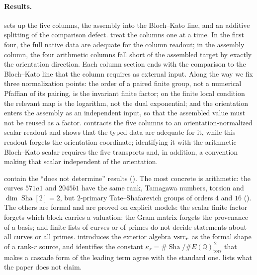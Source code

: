 \documentclass[11pt]{article}
\theoremstyle{definition}
\newcommand{\Q}{\mathbb{Q}}
\newcommand{\Sha}{\operatorname{Sha}}
\newcommand{\tors}{\operatorname{tors}}
\newcommand{\kapr}{\kappa_r}
\begin{document}
\paragraph{Results.}
 sets up the five columns, the assembly into the
Bloch--Kato line, and an additive splitting of the comparison defect.
treat the columns one at a time.  In the first four, the full native data
are adequate for the column readout; in the assembly column, the four
arithmetic columns fall short of the assembled target by exactly the
orientation direction.  Each column section ends with the comparison to
the Bloch--Kato line that the column requires as external input.  Along the way
we fix three normalization points: the order of a paired finite group,
not a numerical Pfaffian of its pairing, is the invariant finite factor;
on the finite local condition the relevant map is the logarithm, not the
dual exponential; and the orientation enters the assembly as an
independent input, so that the assembled value must not be reused as a
factor.   contracts the five columns to an
orientation-normalized scalar readout and shows that the typed data are
adequate for it, while this readout forgets the orientation coordinate;
identifying it with the arithmetic Bloch--Kato scalar requires the five
transports and, in addition, a convention making that scalar independent
of the orientation.

contain the ``does not determine'' results ().  The
most concrete is arithmetic: the curves $571a1$ and $2045b1$ have the same
rank, Tamagawa numbers, torsion and $\dim\Sha[2]=2$, but $2$-primary
Tate--Shafarevich groups of orders $4$ and $16$
().  The others are formal and are proved on
explicit models: the scalar finite factor forgets which block carries a
valuation; the Gram matrix forgets the provenance of a basis; and finite
lists of curves or of primes do not decide statements about all curves or
all primes.   introduces the exterior algebra $\mathrm{vsrc}_r$ as
the formal shape of a rank-$r$ source, and 
identifies the constant $\kapr=\#\Sha/\#E(\Q)_{\tors}^{\,2}$ that makes a
cascade form of the leading term agree with the standard one.
 lists what the paper does not claim.
\end{document}
